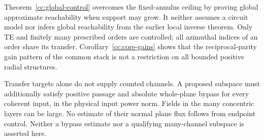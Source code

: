 \begin{remark}
\label{cc:scope}
Theorem~\ref{cc:global-control} overcomes the fixed-annulus ceiling
by proving global approximate reachability when support may grow.
It neither assumes a circuit model nor infers global reachability
from the earlier local inverse theorem. Only TE and finitely many
prescribed orders are controlled; all azimuthal indices of an order
share its transfer. Corollary~\ref{cc:core-gains} shows that the
reciprocal-parity gain pattern of the common stack is not a
restriction on all bounded positive radial structures.

Transfer targets alone do not supply counted channels. A proposed
subspace must additionally satisfy positive passage and absolute
whole-plane bypass for every coherent input, in the physical input
power norm. Fields in the many concentric layers can be large.
No estimate of their normal plane flux follows from endpoint
control. Neither a bypass estimate nor a qualifying many-channel
subspace is asserted here.
\end{remark}
